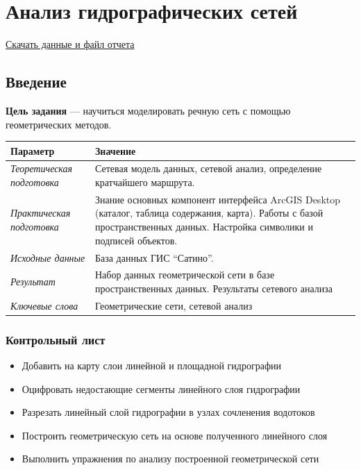\documentclass[]{book}
\providecommand{\tightlist}{%
  \setlength{\itemsep}{0pt}\setlength{\parskip}{0pt}}
\theoremstyle{definition}
\theoremstyle{definition}
\theoremstyle{definition}
\theoremstyle{remark}
\begin{document}
\hypertarget{network-hydro}{%
\chapter{Анализ гидрографических сетей}\label{network-hydro}}

\href{http://autolab.geogr.msu.ru/gis/data/Ex13.zip}{Скачать данные и
файл отчета}

\hypertarget{network-hydro-intro}{%
\section{Введение}\label{network-hydro-intro}}

\textbf{Цель задания} --- научиться моделировать речную сеть с помощью
геометрических методов.

\begin{longtable}[]{@{}ll@{}}
\toprule
Параметр & Значение\tabularnewline
\midrule
\endhead
\emph{Теоретическая подготовка} & Сетевая модель данных, сетевой анализ,
определение кратчайшего маршрута.\tabularnewline
\emph{Практическая подготовка} & Знание основных компонент интерфейса
ArcGIS Desktop (каталог, таблица содержания, карта). Работы с базой
пространственных данных. Настройка символики и подписей
объектов.\tabularnewline
\emph{Исходные данные} & База данных ГИС ``Сатино''.\tabularnewline
\emph{Результат} & Набор данных геометрической сети в базе
пространственных данных. Результаты сетевого анализа\tabularnewline
\emph{Ключевые слова} & Геометрические сети, сетевой
анализ\tabularnewline
\bottomrule
\end{longtable}

\hypertarget{network-hydro-control}{%
\subsection{Контрольный лист}\label{network-hydro-control}}

\begin{itemize}
\tightlist
\item
  Добавить на карту слои линейной и площадной гидрографии
\item
  Оцифровать недостающие сегменты линейного слоя гидрографии
\item
  Разрезать линейный слой гидрографии в узлах сочленения водотоков
\item
  Построить геометрическую сеть на основе полученного линейного слоя
\item
  Выполнить упражнения по анализу построенной геометрической сети
\end{itemize}
\end{document}
